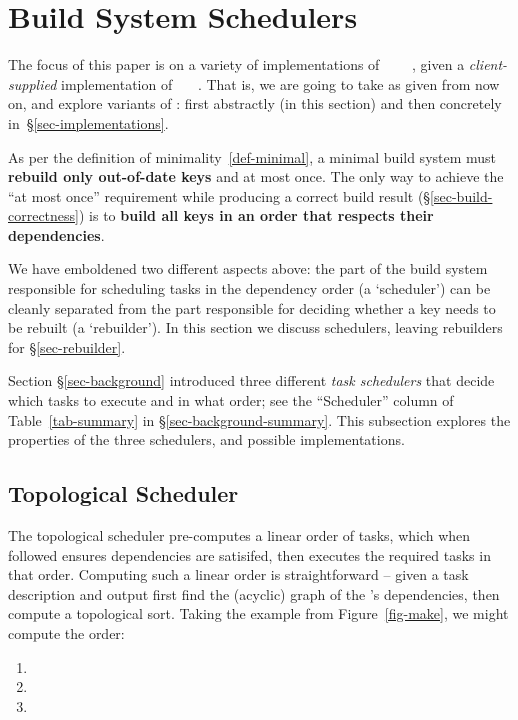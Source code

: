 \section{Build System Schedulers}\label{sec-scheduler}

The focus of this paper is on a variety of implementations of
~~~~, given
a \emph{client-supplied} implementation of ~~~. That
is, we are going to take  as given from now on, and explore variants of
: first abstractly (in this section) and then concretely
in~\S\ref{sec-implementations}.

As per the definition of minimality~\ref{def-minimal}, a minimal build
system must \textbf{rebuild only out-of-date keys} and at most once. The only
way to achieve the ``at most once'' requirement while producing a correct build
result (\S\ref{sec-build-correctness}) is to \textbf{build all keys in an
order that respects their dependencies}.

We have emboldened two different aspects above: the part of the
build system responsible for scheduling tasks in the dependency order
(a `scheduler') can be cleanly separated from the part responsible for deciding
whether a key needs to be rebuilt (a `rebuilder'). In this section we discuss schedulers,
leaving rebuilders for \S\ref{sec-rebuilder}.

Section \S\ref{sec-background} introduced three different \emph{task schedulers}
that decide which tasks to execute and in what order; see the ``Scheduler'' column
of Table~\ref{tab-summary} in \S\ref{sec-background-summary}.
This subsection explores the properties of the three schedulers, and
possible implementations.

\subsection{Topological Scheduler}\label{sec-topological}

The topological scheduler pre-computes a linear order of tasks, which when followed ensures
dependencies are satisifed, then executes the required tasks in that order. Computing such a linear
order is straightforward -- given a task description and output  first find the (acyclic)
graph of the 's dependencies, then compute a topological sort. Taking the example from
Figure~\ref{fig-make}, we might compute the order:

\begin{enumerate}
\item {}
\item {}
\item {}
\end{enumerate}

